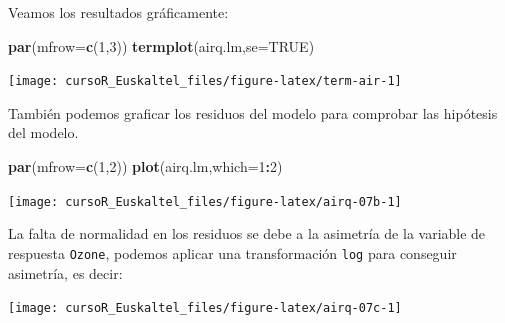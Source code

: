 \documentclass[]{book}
\newenvironment{Shaded}{\begin{snugshade}}{\end{snugshade}}
\newcommand{\KeywordTok}[1]{\textcolor[rgb]{0.13,0.29,0.53}{\textbf{#1}}}
\newcommand{\DataTypeTok}[1]{\textcolor[rgb]{0.13,0.29,0.53}{#1}}
\newcommand{\DecValTok}[1]{\textcolor[rgb]{0.00,0.00,0.81}{#1}}
\newcommand{\StringTok}[1]{\textcolor[rgb]{0.31,0.60,0.02}{#1}}
\newcommand{\OtherTok}[1]{\textcolor[rgb]{0.56,0.35,0.01}{#1}}
\newcommand{\OperatorTok}[1]{\textcolor[rgb]{0.81,0.36,0.00}{\textbf{#1}}}
\newcommand{\NormalTok}[1]{#1}
\begin{document}
Veamos los resultados gráficamente:

\begin{Shaded}
\begin{Highlighting}[]
\KeywordTok{par}\NormalTok{(}\DataTypeTok{mfrow=}\KeywordTok{c}\NormalTok{(}\DecValTok{1}\NormalTok{,}\DecValTok{3}\NormalTok{))}
\KeywordTok{termplot}\NormalTok{(airq.lm,}\DataTypeTok{se=}\OtherTok{TRUE}\NormalTok{)}
\end{Highlighting}
\end{Shaded}

\begin{center}\texttt{[image: cursoR\_Euskaltel\_files/figure-latex/term-air-1]} \end{center}

También podemos graficar los residuos del modelo para comprobar las
hipótesis del modelo.

\begin{Shaded}
\begin{Highlighting}[]
\KeywordTok{par}\NormalTok{(}\DataTypeTok{mfrow=}\KeywordTok{c}\NormalTok{(}\DecValTok{1}\NormalTok{,}\DecValTok{2}\NormalTok{))}
\KeywordTok{plot}\NormalTok{(airq.lm,}\DataTypeTok{which=}\DecValTok{1}\OperatorTok{:}\DecValTok{2}\NormalTok{)}
\end{Highlighting}
\end{Shaded}

\begin{center}\texttt{[image: cursoR\_Euskaltel\_files/figure-latex/airq-07b-1]} \end{center}

La falta de normalidad en los residuos se debe a la asimetría de la
variable de respuesta \texttt{Ozone}, podemos aplicar una transformación
\texttt{log} para conseguir asimetría, es decir:

\begin{Shaded}
\end{Shaded}

\begin{center}\texttt{[image: cursoR\_Euskaltel\_files/figure-latex/airq-07c-1]} \end{center}
\end{document}
